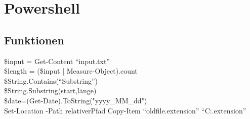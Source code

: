 \chapter{Powershell}\label{chap:Powershell}
\section{Funktionen}
\$input = Get-Content \enquote{input.txt}\\
\$length = (\$input | Measure-Object).count\\
\$String.Contains(\enquote{Substring})\\
\$String.Substring(start,länge)\\
\$date=(Get-Date).ToString("yyyy\_MM\_dd")\\
Set-Location -Path relativerPfad
Copy-Item \enquote{oldfile.extension} \enquote{C:\newfile.extension}\\
